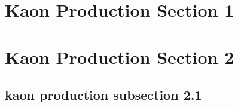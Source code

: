 \section{Kaon Production Section 1}

\section{Kaon Production Section 2}

\subsection{kaon production subsection 2.1}
